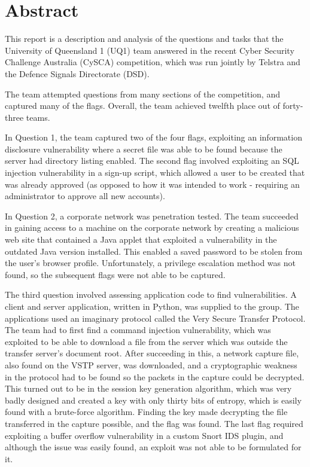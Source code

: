 \chapter{Abstract}

This report is a description and analysis of the questions and tasks that the 
University of Queensland 1 (UQ1) team answered in the recent Cyber Security
Challenge Australia (CySCA) competition, which was run jointly by Telstra and
the Defence Signals Directorate (DSD).

The team attempted questions from many sections of the competition, and
captured many of the flags. Overall, the team achieved twelfth place out of
forty-three teams.

In Question 1, the team captured two of the four flags, exploiting an
information disclosure vulnerability where a secret file was able to be found
because the server had directory listing enabled. The second flag involved
exploiting an SQL injection vulnerability in a sign-up script, which allowed
a user to be created that was already approved (as opposed to how it was
intended to work - requiring an administrator to approve all new accounts).

In Question 2, a corporate network was penetration tested. The team succeeded
in gaining access to a machine on the corporate network by creating a
malicious web site that contained a Java applet that exploited a vulnerability
in the outdated Java version installed. This enabled a saved password to be
stolen from the user's browser profile. Unfortunately, a privilege escalation
method was not found, so the subsequent flags were not able to be captured.

The third question involved assessing application code to find vulnerabilities.
A client and server application, written in Python, was supplied to the group.
The applications used an imaginary protocol called the Very Secure Transfer
Protocol. The team had to first find a command injection vulnerability, which
was exploited to be able to download a file from the server which was outside
the transfer server's document root. After succeeding in this, a network
capture file, also found on the VSTP server, was downloaded, and a
cryptographic weakness in the protocol had to be found so the packets in the
capture could be decrypted. This turned out to be in the session key
generation algorithm, which was very badly designed and created a key with only
thirty bits of entropy, which is easily found with a brute-force algorithm.
Finding the key made decrypting the file transferred in the capture possible,
and the flag was found. The last flag required exploiting a buffer overflow
vulnerability in a custom Snort IDS plugin, and although the issue was
easily found, an exploit was not able to be formulated for it.

